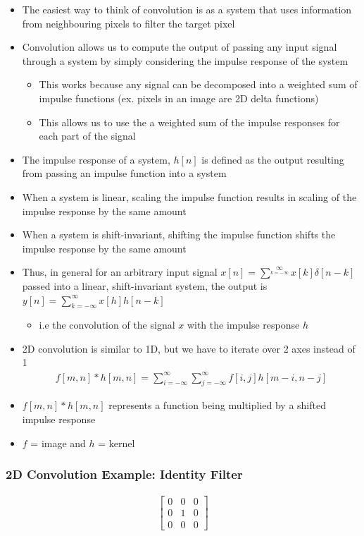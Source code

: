 \documentclass[letterpaper,12pt]{article}
\begin{document}
\begin{itemize}
 \item The easiest way to think of convolution is as a system that uses information from neighbouring pixels to filter the target pixel
 \item Convolution allows us to compute the output of passing any input signal through a system by simply considering the impulse response of the system
       \begin{itemize}
        \item This works because any signal can be decomposed into a weighted sum of impulse functions (ex. pixels in an image are 2D delta functions)
        \item This allows us to use the a weighted sum of the impulse responses for each part of the signal
       \end{itemize}
 \item The impulse response of a system, $h[n]$ is defined as the output resulting from passing an impulse function into a system
 \item When a system is linear, scaling the impulse function results in scaling of the impulse response by the same amount
 \item When a system is shift-invariant, shifting the impulse function shifts the impulse response by the same amount
 \item Thus, in general for an arbitrary input signal $x[n]= \sum\limits^{\infty}\limits_{k=-\infty} x[k] \delta [n-k]$ passed into a linear, shift-invariant system, the output is $y[n] = \sum\limits^{\infty}_{k=-\infty} x[h]h[n-k]$
       \begin{itemize}
        \item i.e the convolution of the signal $x$ with the impulse response $h$
       \end{itemize}
 \item 2D convolution is similar to 1D, but we have to iterate over 2 axes instead of 1
       \begin{align}
        f[m,n] * h[m,n] = \sum\limits_{i = -\infty}^{\infty}\sum\limits_{j = -\infty}^{\infty} f[i, j] h[m-i,n-j]
       \end{align}
 \item $f[m,n]*h[m,n]$ represents a function being multiplied by a shifted impulse response
 \item $f$ = image and $h$ = kernel
\end{itemize}

\subsubsection{2D Convolution Example: Identity Filter}
\begin{align}
 \begin{bmatrix}
  0 & 0 & 0 \\
  0 & 1 & 0 \\
  0 & 0 & 0
 \end{bmatrix}
 \tag{No change in output}
\end{align}
\end{document}
